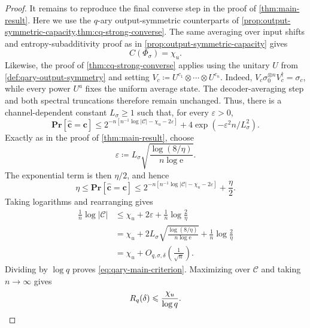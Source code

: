 \documentclass[11pt]{article}
\renewcommand{\leq}{\leqslant}
\renewcommand{\geq}{\geqslant}
\theoremstyle{remark}
\newcommand{\cC}{\mathcal{C}}
\newcommand{\Prb}{\mathbf{Pr}}
\newcommand{\bchat}{\hat{\mathbf{c}}}
\newcommand{\bc}{\mathbf{c}}
\newcommand{\eps}{\varepsilon}
\newcommand{\abs}[1]{\left|#1\right|}
\begin{document}
\begin{proof}
It remains to reproduce the final converse step in the proof of \cref{thm:main-result}. Here we use the $q$-ary output-symmetric counterparts of \cref{prop:output-symmetric-capacity,thm:cq-strong-converse}. The same averaging over input shifts and entropy-subadditivity proof as in \cref{prop:output-symmetric-capacity} gives
\begin{equation*}
C(\Phi_\sigma) = \chi_u.
\end{equation*}
Likewise, the proof of \cref{thm:cq-strong-converse} applies using the unitary $U$ from \cref{def:qary-output-symmetry} and setting $V_c \coloneqq U^{c_1} \otimes \cdots \otimes U^{c_n}$. Indeed, $V_c\sigma_0^{\otimes n}V_c^\dagger = \sigma_c$, while every power $U^a$ fixes the uniform average state. The decoder-averaging step and both spectral truncations therefore remain unchanged. Thus, there is a channel-dependent constant $L_\sigma \geq 1$ such that, for every $\eps > 0$,
\begin{equation*}
\Prb[\bchat = \bc]
\leq 2^{-n[n^{-1}\log{\abs{\cC}}-\chi_u-2\eps]}
+4\exp\left(-\eps^2n/L_\sigma^2\right).
\end{equation*}
Exactly as in the proof of \cref{thm:main-result}, choose
\begin{equation*}
\eps \coloneqq L_\sigma\sqrt{\frac{\log(8/\eta)}{n\log{\mathrm{e}}}}.
\end{equation*}
The exponential term is then $\eta/2$, and hence
\begin{equation*}
\eta
\leq \Prb[\bchat = \bc]
\leq 2^{-n[n^{-1}\log{\abs{\cC}}-\chi_u-2\eps]}
+\frac{\eta}{2}.
\end{equation*}
Taking logarithms and rearranging gives
\begin{align*}
\frac{1}{n}\log{\abs{\cC}}
&\leq \chi_u + 2\eps + \frac{1}{n}\log{\frac{2}{\eta}} \\
&= \chi_u + 2L_\sigma\sqrt{\frac{\log(8/\eta)}{n\log{\mathrm{e}}}} + \frac{1}{n}\log{\frac{2}{\eta}} \\
&= \chi_u + O_{q,\sigma,\delta}\left(\frac{1}{\sqrt{n}}\right).
\end{align*}
Dividing by $\log{q}$ proves \eqref{eq:qary-main-criterion}. Maximizing over $\cC$ and taking $n \to \infty$ gives
\begin{equation*}
R_q(\delta) \leq \frac{\chi_u}{\log{q}}.\qedhere
\end{equation*}
\end{proof}
\end{document}

